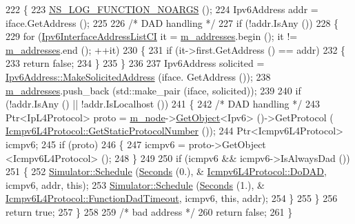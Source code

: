 \begin{DoxyCode}
222 \{
223   \hyperlink{log-macros-disabled_8h_a8f7e4afc291c9d29a65c18ac1f79197b}{NS\_LOG\_FUNCTION\_NOARGS} ();
224   Ipv6Address addr = iface.GetAddress ();
225 
226   \textcolor{comment}{/* DAD handling */}
227   \textcolor{keywordflow}{if} (!addr.IsAny ())
228     \{
229       \textcolor{keywordflow}{for} (\hyperlink{classns3_1_1Ipv6Interface_a715fc50c7b144e64d4849d26ad6c0b32}{Ipv6InterfaceAddressListCI} it = \hyperlink{classns3_1_1Ipv6Interface_aa52ea13547366d30792b0edd3faf3979}{m\_addresses}.begin (); it !=
       \hyperlink{classns3_1_1Ipv6Interface_aa52ea13547366d30792b0edd3faf3979}{m\_addresses}.end (); ++it)
230         \{
231           \textcolor{keywordflow}{if} (it->first.GetAddress () == addr)
232             \{
233               \textcolor{keywordflow}{return} \textcolor{keyword}{false};
234             \}
235         \}
236 
237       Ipv6Address solicited = \hyperlink{classns3_1_1Ipv6Address_a1f6831d89cb902b8af5c73baaab97832}{Ipv6Address::MakeSolicitedAddress} (iface.
      GetAddress ());
238       \hyperlink{classns3_1_1Ipv6Interface_aa52ea13547366d30792b0edd3faf3979}{m\_addresses}.push\_back (std::make\_pair (iface, solicited));
239 
240       \textcolor{keywordflow}{if} (!addr.IsAny () || !addr.IsLocalhost ())
241         \{
242           \textcolor{comment}{/* DAD handling */}
243           Ptr<IpL4Protocol> proto = \hyperlink{classns3_1_1Ipv6Interface_abc501f6da776acb53e65d8e657813d60}{m\_node}->\hyperlink{classns3_1_1Object_a13e18c00017096c8381eb651d5bd0783}{GetObject}<Ipv6> ()->GetProtocol (
      \hyperlink{classns3_1_1Icmpv6L4Protocol_af845269e6c3f4509a4e287195c965afc}{Icmpv6L4Protocol::GetStaticProtocolNumber} ());
244           Ptr<Icmpv6L4Protocol> icmpv6;
245           \textcolor{keywordflow}{if} (proto)
246             \{
247               icmpv6 = proto->GetObject <Icmpv6L4Protocol> ();
248             \}
249 
250           \textcolor{keywordflow}{if} (icmpv6 && icmpv6->IsAlwaysDad ())
251             \{
252               \hyperlink{classns3_1_1Simulator_a671882c894a08af4a5e91181bf1eec13}{Simulator::Schedule} (\hyperlink{group__timecivil_ga33c34b816f8ff6628e33d5c8e9713b9e}{Seconds} (0.), &
      \hyperlink{classns3_1_1Icmpv6L4Protocol_a926ea8e638e30cee8c3c17d4141f3f58}{Icmpv6L4Protocol::DoDAD}, icmpv6, addr, \textcolor{keyword}{this});
253               \hyperlink{classns3_1_1Simulator_a671882c894a08af4a5e91181bf1eec13}{Simulator::Schedule} (\hyperlink{group__timecivil_ga33c34b816f8ff6628e33d5c8e9713b9e}{Seconds} (1.), &
      \hyperlink{classns3_1_1Icmpv6L4Protocol_a0a7a989da20971c66f85b210be7559c1}{Icmpv6L4Protocol::FunctionDadTimeout}, icmpv6, \textcolor{keyword}{this}, addr);
254             \}
255         \}
256       \textcolor{keywordflow}{return} \textcolor{keyword}{true};
257     \}
258 
259   \textcolor{comment}{/* bad address */}
260   \textcolor{keywordflow}{return} \textcolor{keyword}{false};
261 \}
\end{DoxyCode}


